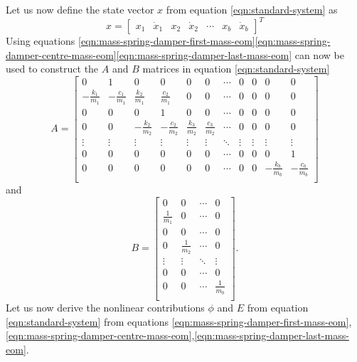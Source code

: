 Let us now define the state vector $x$ from equation \eqref{eqn:standard-system} as
\begin{equation}\label{eqn:msd-x}
    x =
    \begin{bmatrix}
        x_1 & \dot{x}_1 & x_2 & \dot{x}_2 & \cdots & x_b & \dot{x}_{b}
    \end{bmatrix}^T
\end{equation}
Using equations \eqref{eqn:mass-spring-damper-first-mass-eom}\eqref{eqn:mass-spring-damper-centre-mass-eom}\eqref{eqn:mass-spring-damper-last-mass-eom} can now be used to construct the $A$ and $B$ matrices in equation \eqref{eqn:standard-system}
\begin{equation}\label{eqn:msd-A}
    A =
    \begin{bmatrix}
        0 & 1 & 0 & 0 & 0 & 0 & \cdots & 0 & 0 & 0 & 0 \\
        -\frac{k_1}{m_1} & -\frac{c_1}{m_1} & \frac{k_2}{m_1} & \frac{c_2}{m_1} & 0 & 0 & \cdots & 0 & 0 & 0 & 0 \\
        0 & 0 & 0 & 1 & 0 & 0 & \cdots & 0 & 0 & 0 & 0 \\
       0 & 0 & -\frac{k_2}{m_2} & -\frac{c_2}{m_2} & \frac{k_3}{m_2} & \frac{c_3}{m_2} & \cdots & 0 & 0 & 0 & 0 \\
        \vdots & \vdots & \vdots & \vdots & \vdots & \vdots & \ddots & \vdots & \vdots & \vdots & \vdots \\
        0 & 0 & 0 & 0 & 0 & 0 & \cdots & 0 & 0 & 0 & 1 \\
        0 & 0 & 0 & 0 & 0 & 0 & \cdots & 0 & 0 & -\frac{k_b}{m_b} & -\frac{c_b}{m_b} \\
    \end{bmatrix}
\end{equation}
and
\begin{equation}\label{eqn:msd-B}
    B = 
    \begin{bmatrix}
        0 & 0 & \cdots & 0 \\
        \frac{1}{m_1} & 0 & \cdots & 0 \\
        0 & 0 & \cdots & 0 \\
        0 & \frac{1}{m_2} & \cdots & 0 \\
        \vdots & \vdots & \ddots & \vdots \\
        0 & 0 & \cdots & 0 \\
        0 & 0 & \cdots & \frac{1}{m_b} \\
    \end{bmatrix}.
\end{equation}
Let us now derive the nonlinear contributions $\phi$ and $E$ from equation \eqref{eqn:standard-system} from equations \eqref{eqn:mass-spring-damper-first-mass-eom},\eqref{eqn:mass-spring-damper-centre-mass-eom},\eqref{eqn:mass-spring-damper-last-mass-eom}.
